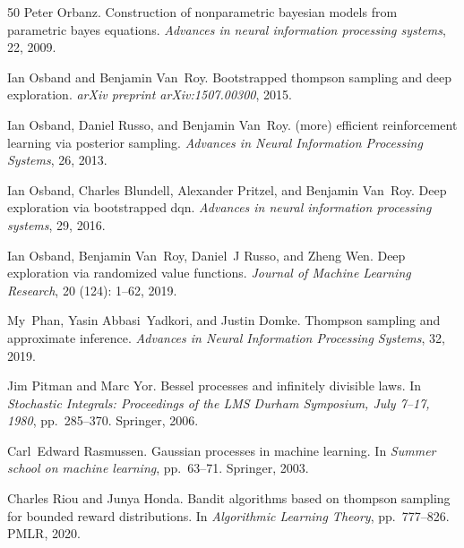 \documentclass[10pt]{article}
\begin{document}
\begin{thebibliography}{50}
Peter Orbanz.
\newblock Construction of nonparametric bayesian models from parametric bayes equations.
\newblock \emph{Advances in neural information processing systems}, 22, 2009.

Ian Osband and Benjamin Van~Roy.
\newblock Bootstrapped thompson sampling and deep exploration.
\newblock \emph{arXiv preprint arXiv:1507.00300}, 2015.

Ian Osband, Daniel Russo, and Benjamin Van~Roy.
\newblock (more) efficient reinforcement learning via posterior sampling.
\newblock \emph{Advances in Neural Information Processing Systems}, 26, 2013.

Ian Osband, Charles Blundell, Alexander Pritzel, and Benjamin Van~Roy.
\newblock Deep exploration via bootstrapped dqn.
\newblock \emph{Advances in neural information processing systems}, 29, 2016.

Ian Osband, Benjamin Van~Roy, Daniel~J Russo, and Zheng Wen.
\newblock Deep exploration via randomized value functions.
\newblock \emph{Journal of Machine Learning Research}, 20 (124): 1--62, 2019.

My~Phan, Yasin Abbasi~Yadkori, and Justin Domke.
\newblock Thompson sampling and approximate inference.
\newblock \emph{Advances in Neural Information Processing Systems}, 32, 2019.

Jim Pitman and Marc Yor.
\newblock Bessel processes and infinitely divisible laws.
\newblock In \emph{Stochastic Integrals: Proceedings of the LMS Durham Symposium, July 7--17, 1980}, pp.\  285--370. Springer, 2006.

Carl~Edward Rasmussen.
\newblock Gaussian processes in machine learning.
\newblock In \emph{Summer school on machine learning}, pp.\  63--71. Springer, 2003.

Charles Riou and Junya Honda.
\newblock Bandit algorithms based on thompson sampling for bounded reward distributions.
\newblock In \emph{Algorithmic Learning Theory}, pp.\  777--826. PMLR, 2020.


\end{thebibliography}
\end{document}
